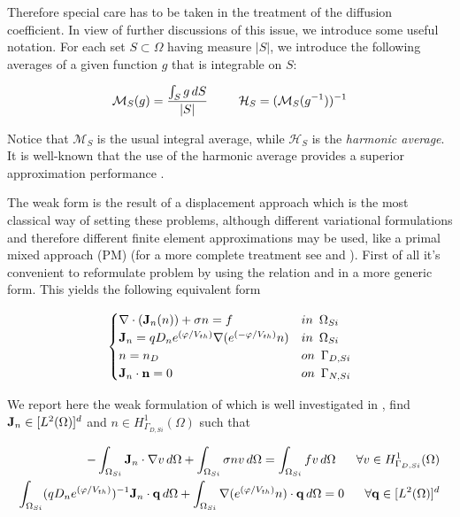 Therefore special care has to be taken in the treatment of the diffusion coefficient. In view of further discussions of this issue, we introduce some useful notation. For each set $S \subset \Omega$ having measure $|S|$, we introduce the following averages of a given function $g$ that is integrable on $S$:

\begin{equation*}
\mathcal{M}_S(g) = \dfrac{\int_S g \, dS}{|S|} \psp{15} \mathcal{H}_S = (\mathcal{M}_S(g^{-1}))^{-1} 
\end{equation*}

Notice that $\mathcal{M}_S$ is the usual integral average, while $\mathcal{H}_S$ is the \textit{harmonic average}. It is well-known that the use of the harmonic average provides a superior approximation performance \cite{BabuskaMixMet}.


The weak form   is the result of a displacement approach which is the most classical way of setting these problems, although different variational formulations and therefore different finite element approximations may be used, like a primal mixed approach (PM) (for a more complete treatment see \cite{Zikatanov:EAFE} and \cite{TesiDotDeFalco}).  First of all it's convenient to reformulate problem  by using the relation  and  in a more generic form. This yields the following equivalent form

\begin{equation}
\label{eq: LEC system slotboom generic}
\begin{cases}
\nabla \cdot (\vect{J}_n(n) ) +\sigma n = f & in \psp{3} \Omega_{Si}
 \\
 \vect{J}_n = qD_n e^{(\varphi/V_{th})} \nabla (e^{(-\varphi/V_{th})}n) & in \psp{3} \Omega_{Si}\\
n = n_D & on \psp{3} \Gamma_{D,Si}
 \\
 \vect{J}_n \cdot \vect{n} = 0 & on \psp{3} \Gamma_{N,Si}
\end{cases}
\end{equation}

We report here the weak formulation of  which is well investigated in \cite{TesiDotDeFalco}, find $\mathbf{J}_n \in [L^2(\Omega)]^d$ and $n \in H^1_{\Gamma_{D,Si}}(\Omega)$ such that

\begin{align}
- \int_{\Omega_{Si}} \vect{J}_n\cdot \nabla v \, d\Omega + \int_{\Omega_{Si}} \sigma n v \, d\Omega = \int_{\Omega_{Si}} f v \, d\Omega \psp{10} \forall v \in H^1_{\Gamma_{D,Si}}(\Omega)
\label{eq: weak form PM1} \\
\int_{\Omega_{Si}} (qD_n e^{(\varphi/V_{th})})^{-1} \vect{J}_n\cdot \vect{q} \, d\Omega + \int_{\Omega_{Si}} \nabla(e^{(\varphi/V_{th})}n) \cdot \vect{q} \, d\Omega = 0 \psp{10} \forall \vect{q} \in [L^2(\Omega)]^d \label{eq: weak form PM2} 
\end{align}

